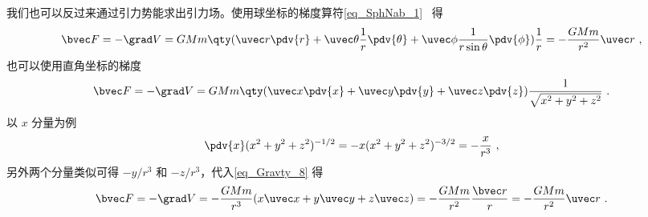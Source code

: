 我们也可以反过来通过引力势能求出引力场。使用球坐标的梯度算符\autoref{eq_SphNab_1}~ 得
\begin{equation}
\bvec F = -\grad V = GMm \qty( \uvec r\pdv{r} + \uvec \theta \frac{1}{r}\pdv{\theta} + \uvec \phi \frac{1}{r\sin \theta}\pdv{\phi} )\frac{1}{r} =  - \frac{GMm}{r^2}\uvec r~,
\end{equation}
也可以使用直角坐标的梯度
\begin{equation}\label{eq_Gravty_8}
\bvec F = -\grad V = GMm \qty(\uvec x\pdv{x} + \uvec y\pdv{y} + \uvec z\pdv{z} )\frac{1}{\sqrt{x^2 + y^2 + z^2}}~.
\end{equation}
以 $x$ 分量为例
\begin{equation}
\pdv{x}(x^2 + y^2 + z^2)^{-1/2} =  - x(x^2 + y^2 + z^2)^{-3/2} =  - \frac{x}{r^3}~,
\end{equation}
另外两个分量类似可得 $- y/r^3$ 和 $- z/r^3$，代入\autoref{eq_Gravty_8} 得
\begin{equation}
\bvec F = -\grad V =  - \frac{GMm}{r^3} (x\uvec x + y\uvec y + z\uvec z) =  - \frac{GMm}{r^2}\frac{\bvec r}{r} =  - \frac{GMm}{r^2}\uvec r~.
\end{equation}
